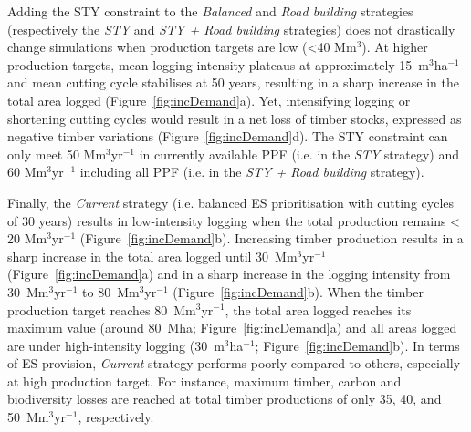 \documentclass{article}
\begin{document}
Adding the STY constraint to the \textit{Balanced} and \textit{Road building} strategies (respectively the \textit{STY} and \textit{STY + Road building} strategies) does not drastically change simulations when production targets are low (<40 Mm$^3$). At higher production targets, mean logging intensity plateaus at approximately 15~m$^3$ha$^{-1}$ and mean cutting cycle stabilises at 50 years, resulting in a sharp increase in the total area logged (Figure~\ref{fig:incDemand}a). Yet, intensifying logging or shortening cutting cycles would result in a net loss of timber stocks, expressed as negative timber variations (Figure~\ref{fig:incDemand}d). The STY constraint can only meet 50 Mm$^3$yr$^{-1}$ in currently available PPF (i.e. in the \textit{STY} strategy) and 60 Mm$^3$yr$^{-1}$ including all PPF (i.e. in the \textit{STY + Road building} strategy). 

Finally, the \textit{Current} strategy (i.e. balanced ES prioritisation with cutting cycles of 30 years) results in low-intensity logging when the total production remains < 20 Mm$^3$yr$^{-1}$ (Figure~\ref{fig:incDemand}b). Increasing timber production results in a sharp increase in the total area logged until 30~Mm$^3$yr$^{-1}$ (Figure~\ref{fig:incDemand}a) and in a sharp increase in the logging intensity from 30~Mm$^3$yr$^{-1}$ to 80~Mm$^3$yr$^{-1}$ (Figure~\ref{fig:incDemand}b). When the timber production target reaches 80~Mm$^3$yr$^{-1}$, the total area logged reaches its maximum value (around 80~Mha; Figure~\ref{fig:incDemand}a) and all areas logged are under high-intensity logging (30~m$^3$ha$^{-1}$; Figure~\ref{fig:incDemand}b). In terms of ES provision, \textit{Current} strategy performs poorly compared to others, especially at high production target. For instance, maximum timber, carbon and biodiversity losses are reached at total timber productions of only 35, 40, and 50~Mm$^3$yr$^{-1}$, respectively.  
\end{document}
